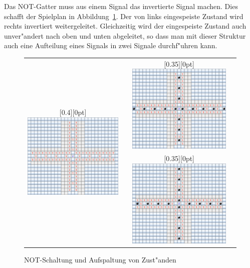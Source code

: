 Das NOT-Gatter muss aus einem Signal das invertierte Signal
machen. Dies schafft der Spielplan in Abbildung~\ref{splitter}.
Der von links eingespeiste Zustand wird rechts invertiert weitergeleitet.
Gleichzeitig wird der eingespeiste Zustand auch unver"andert nach
oben und unten abgeleitet, so dass man mit dieser Struktur auch
eine Aufteilung eines Signals in zwei Signale durchf"uhren kann.
\begin{figure}
\begin{center}
\begin{tabular}{|c|c|c|c|}
\hline
\multirow{2}{0.4\hsize}{%
\raisebox{-5ex}[0.4\hsize][0pt]{%
\includegraphics[width=\hsize]{graphics/splitter}%
}}&
\raisebox{11.5ex}{$0$}&
\raisebox{0pt}[0.35\hsize][0pt]{%
\includegraphics[width=0.4\hsize]{graphics/splitter-1}}&
\raisebox{11ex}{$1$}\\
\cline{2-4}
&
\raisebox{11.5ex}{$1$}&
\raisebox{0pt}[0.35\hsize][0pt]{%
\includegraphics[width=0.4\hsize]{graphics/splitter-0}}&
\raisebox{11ex}{$0$}\\
\hline
\end{tabular}
\end{center}
\caption{NOT-Schaltung und Aufspaltung von Zust"anden\label{splitter}}
\end{figure}%

